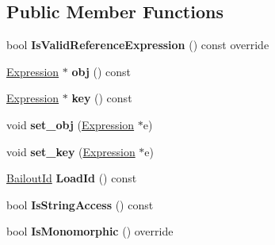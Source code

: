 \subsection*{Public Member Functions}
\begin{DoxyCompactItemize}
\item 
bool {\bfseries Is\+Valid\+Reference\+Expression} () const  override\hypertarget{classv8_1_1internal_1_1_property_a9395e6a0f6df9194092be96f983fed1d}{}\label{classv8_1_1internal_1_1_property_a9395e6a0f6df9194092be96f983fed1d}

\item 
\hyperlink{classv8_1_1internal_1_1_expression}{Expression} $\ast$ {\bfseries obj} () const \hypertarget{classv8_1_1internal_1_1_property_afeea58e15e3313e1e09d353b759a8fb4}{}\label{classv8_1_1internal_1_1_property_afeea58e15e3313e1e09d353b759a8fb4}

\item 
\hyperlink{classv8_1_1internal_1_1_expression}{Expression} $\ast$ {\bfseries key} () const \hypertarget{classv8_1_1internal_1_1_property_adbbe545444cb44401b7cf530f98db1e5}{}\label{classv8_1_1internal_1_1_property_adbbe545444cb44401b7cf530f98db1e5}

\item 
void {\bfseries set\+\_\+obj} (\hyperlink{classv8_1_1internal_1_1_expression}{Expression} $\ast$e)\hypertarget{classv8_1_1internal_1_1_property_aff3cb79379b413979d48f6fa5951b082}{}\label{classv8_1_1internal_1_1_property_aff3cb79379b413979d48f6fa5951b082}

\item 
void {\bfseries set\+\_\+key} (\hyperlink{classv8_1_1internal_1_1_expression}{Expression} $\ast$e)\hypertarget{classv8_1_1internal_1_1_property_acf4d2fce68bc4cb3e10be1b4936a8158}{}\label{classv8_1_1internal_1_1_property_acf4d2fce68bc4cb3e10be1b4936a8158}

\item 
\hyperlink{classv8_1_1internal_1_1_bailout_id}{Bailout\+Id} {\bfseries Load\+Id} () const \hypertarget{classv8_1_1internal_1_1_property_a6aee6821ea2e22e6a005a3d6e245a55d}{}\label{classv8_1_1internal_1_1_property_a6aee6821ea2e22e6a005a3d6e245a55d}

\item 
bool {\bfseries Is\+String\+Access} () const \hypertarget{classv8_1_1internal_1_1_property_a1e2b2c5ea50f9637a3dae7c432ae733c}{}\label{classv8_1_1internal_1_1_property_a1e2b2c5ea50f9637a3dae7c432ae733c}

\item 
bool {\bfseries Is\+Monomorphic} () override\hypertarget{classv8_1_1internal_1_1_property_a100e46abba26f56b77a87e03cd0ec83a}{}\label{classv8_1_1internal_1_1_property_a100e46abba26f56b77a87e03cd0ec83a}


\end{DoxyCompactItemize}

